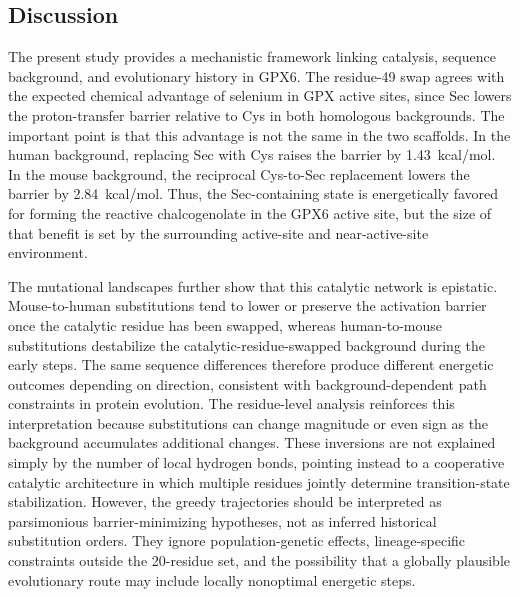\subsection{Discussion}

The present study provides a mechanistic framework linking catalysis, sequence background, and evolutionary history in GPX6. The residue-49 swap agrees with the expected chemical advantage of selenium in GPX active sites, since Sec lowers the proton-transfer barrier relative to Cys in both homologous backgrounds.\cite{Reich2016,prabhakar_elucidation_2005,cardey_selenocysteine_2007,rees_ancient_2024,Kanavos2026SecSelectivity} The important point is that this advantage is not the same in the two scaffolds. In the human background, replacing Sec with Cys raises the barrier by 1.43~kcal/mol. In the mouse background, the reciprocal Cys-to-Sec replacement lowers the barrier by 2.84~kcal/mol. Thus, the Sec-containing state is energetically favored for forming the reactive chalcogenolate in the GPX6 active site, but the size of that benefit is set by the surrounding active-site and near-active-site environment.\cite{Warshel2006,Kamerlin2010,VillaWarshel2001}

The mutational landscapes further show that this catalytic network is epistatic. Mouse-to-human substitutions tend to lower or preserve the activation barrier once the catalytic residue has been swapped, whereas human-to-mouse substitutions destabilize the catalytic-residue-swapped background during the early steps. The same sequence differences therefore produce different energetic outcomes depending on direction, consistent with background-dependent path constraints in protein evolution.\cite{Weinreich2006,starr2016epistasis,storz_compensatory_2018,Kaltenbach2015} The residue-level analysis reinforces this interpretation because substitutions can change magnitude or even sign as the background accumulates additional changes. These inversions are not explained simply by the number of local hydrogen bonds, pointing instead to a cooperative catalytic architecture in which multiple residues jointly determine transition-state stabilization. However, the greedy trajectories should be interpreted as parsimonious barrier-minimizing hypotheses, not as inferred historical substitution orders. They ignore population-genetic effects, lineage-specific constraints outside the 20-residue set, and the possibility that a globally plausible evolutionary route may include locally nonoptimal energetic steps.


